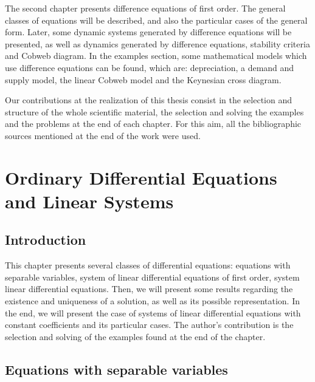 \documentclass[a4paper,12pt]{report}
\begin{document}
The second chapter presents difference equations of first order. The general classes of equations will be described, and also the particular cases of the general form. Later, some dynamic systems generated by difference equations will be presented, as well as dynamics generated by difference equations, stability criteria and Cobweb diagram. In the examples section, some mathematical models which use difference equations can be found, which are: depreciation, a demand and supply model, the linear Cobweb model and the Keynesian cross diagram.\par
Our contributions at the realization of this thesis consist in the selection and structure of the whole scientific material, the selection and solving the examples and the problems at the end of each chapter. For this aim, all the bibliographic sources mentioned at the end of the work were used.

 


 \chapter{Ordinary Differential Equations and Linear Systems}
 \section{Introduction}
 This chapter presents several classes of differential equations: equations with separable variables, system of linear differential equations of first order, system linear differential equations. Then, we will present some results regarding the existence and uniqueness of a solution, as well as its possible representation. In the end, we will present the case of systems of linear differential equations with constant coefficients and its particular cases.
 The author's contribution is the selection and solving of the examples found at the end of the chapter.
 \section{Equations with separable variables}\label{1.1.1}
\end{document}

